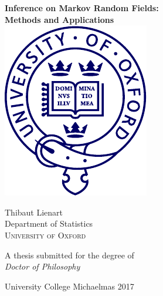 \begin{titlepage}
\begin{center}

\vspace*{1.2cm}

{\Huge{\bfseries Inference on Markov Random Fields:\\[.1cm] Methods and Applications}\\}
\vfill 
\vspace*{-.3cm}
\includegraphics[scale=.8]{figures/oxlogo}
\vspace*{-.9cm}
\vfill

{\Large Thibaut Lienart}\\[1.2cm]

{\large 
   	{Department of Statistics}}\\[0.3cm]
{\large 
   	{\textsc{University of Oxford}}}
	
\vspace*{-.4cm}
\vfill

{\large A thesis submitted for the degree of}\\[.3cm]

{\large \emph{Doctor of Philosophy}}\\[.3cm]
\end{center}
\vfill
{\large University College \hfill Michaelmas 2017}
\end{titlepage}